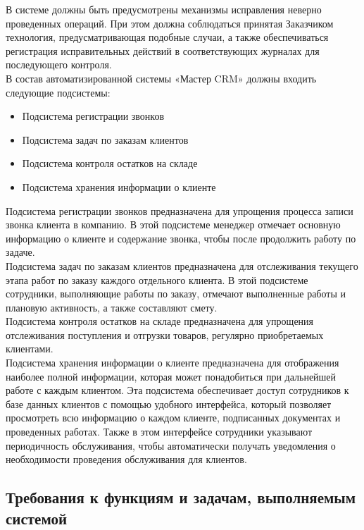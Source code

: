\documentclass[a4paper,12pt]{article}
\begin{document}
В системе должны быть предусмотрены механизмы исправления неверно проведенных операций. При этом должна соблюдаться принятая Заказчиком технология, предусматривающая подобные случаи, а также обеспечиваться регистрация исправительных действий в соответствующих журналах для последующего контроля.\\

В состав автоматизированной системы «Мастер CRM» должны входить следующие подсистемы:
\begin{itemize}
    \item Подсистема регистрации звонков
    \item Подсистема задач по заказам клиентов
    \item Подсистема контроля остатков на складе
    \item Подсистема хранения информации о клиенте
\end{itemize}

Подсистема регистрации звонков предназначена для упрощения процесса записи звонка клиента в компанию. В этой подсистеме менеджер отмечает основную информацию о клиенте и содержание звонка, чтобы после продолжить работу по задаче.\\

Подсистема задач по заказам клиентов предназначена для отслеживания текущего этапа работ по заказу каждого отдельного клиента. В этой подсистеме сотрудники, выполняющие работы по заказу, отмечают выполненные работы и плановую активность, а также составляют смету.\\

Подсистема контроля остатков на складе предназначена для упрощения отслеживания поступления и отгрузки товаров, регулярно приобретаемых клиентами.\\

Подсистема хранения информации о клиенте предназначена для отображения наиболее полной информации, которая может понадобиться при дальнейшей работе с каждым клиентом. Эта подсистема обеспечивает доступ сотрудников к базе данных клиентов с помощью удобного интерфейса, который позволяет просмотреть всю информацию о каждом клиенте, подписанных документах и проведенных работах. Также в этом интерфейсе сотрудники указывают периодичность обслуживания, чтобы автоматически получать уведомления о необходимости проведения обслуживания для клиентов.

\subsection{Требования к функциям и задачам, выполняемым системой}
\end{document}
